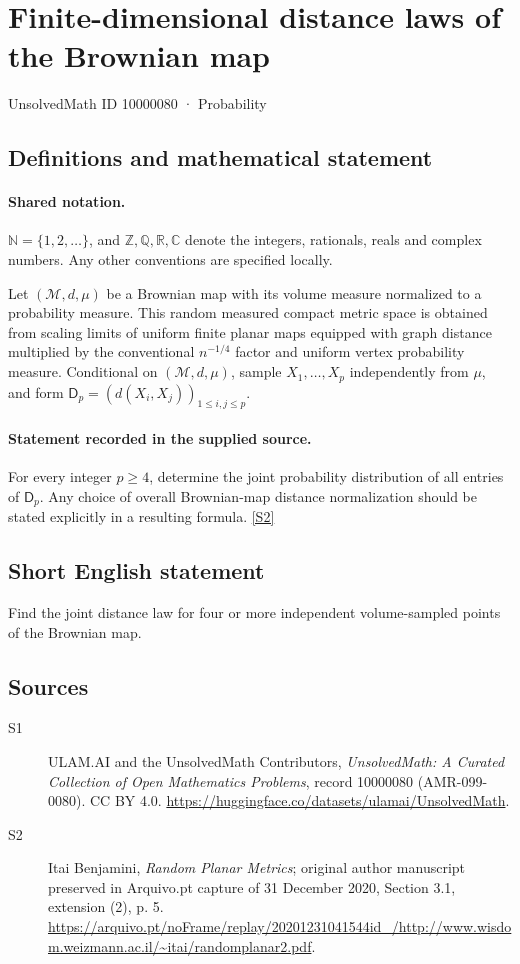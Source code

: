 \documentclass[11pt]{article}
\newcommand{\sref}[2]{\hyperlink{source:#1:#2}{[S#2]}}
\begin{document}
\setcounter{section}{10000079}
\section{Finite-dimensional distance laws of the Brownian map}\label{10000080}
{\small\sffamily UnsolvedMath ID 10000080 · Probability}
\subsection{Definitions and mathematical statement}

\paragraph{Shared notation.}$\mathbb N=\{1,2,\ldots\}$, and $\mathbb Z,\mathbb Q,\mathbb R,\mathbb C$ denote the integers, rationals, reals and complex numbers. Any other conventions are specified locally.


Let $(\mathcal M,d,\mu)$ be a Brownian map with its volume measure normalized to a probability measure. This random measured compact metric space is obtained from scaling limits of uniform finite planar maps equipped with graph distance multiplied by the conventional $n^{-1/4}$ factor and uniform vertex probability measure. Conditional on $(\mathcal M,d,\mu)$, sample $X_1,\ldots,X_p$ independently from $\mu$, and form $\mathsf D_p=(d(X_i,X_j))_{1\le i,j\le p}$.
\paragraph{Statement recorded in the supplied source.}
For every integer $p\ge4$, determine the joint probability distribution of all entries of $\mathsf D_p$. Any choice of overall Brownian-map distance normalization should be stated explicitly in a resulting formula. \sref{10000080}{2}
\subsection{Short English statement}
Find the joint distance law for four or more independent volume-sampled points of the Brownian map.
\subsection{Sources}
\begin{description}
\item[\hypertarget{source:10000080:1}{S1}] ULAM.AI and the UnsolvedMath Contributors, \emph{UnsolvedMath: A Curated Collection of Open Mathematics Problems}, record 10000080 (AMR-099-0080). CC BY 4.0. \url{https://huggingface.co/datasets/ulamai/UnsolvedMath}.
\item[\hypertarget{source:10000080:2}{S2}] Itai Benjamini, \emph{Random Planar Metrics}; original author manuscript preserved in Arquivo.pt capture of 31 December 2020, Section 3.1, extension (2), p. 5. \url{https://arquivo.pt/noFrame/replay/20201231041544id_/http://www.wisdom.weizmann.ac.il/~itai/randomplanar2.pdf}.
\end{description}
\label{end:10000080}
\end{document}
